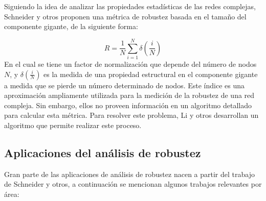 Siguiendo la idea de analizar las propiedades estadísticas de las redes complejas, Schneider y otros\cite{Schneider2011} proponen una métrica de robustez basada en el tamaño del componente gigante, de la siguiente forma:

\begin{equation}
 R = \frac{1}{N} \sum \limits_{i=1}^{N} \delta(\frac{i}{N}) 
\end{equation}
En el cual se tiene un factor de normalización que depende del número de nodos $N$, y $\delta(\frac{i}{N})$ es la medida de una propiedad estructural en el componente gigante a medida que se pierde un número determinado de nodos. Este índice es una aproximación ampliamente utilizada para la medición de la robustez de una red compleja. Sin embargo, ellos no proveen información en un algoritmo detallado para calcular esta métrica. Para resolver este problema, Li y otros\cite{Li2012} desarrollan un algoritmo que permite realizar este proceso.

\subsection{Aplicaciones del análisis de robustez}

Gran parte de las aplicaciones de análisis de robustez nacen a partir del trabajo de Schneider y otros\cite{Schneider2011}, a continuación se mencionan algunos trabajos relevantes por área:

